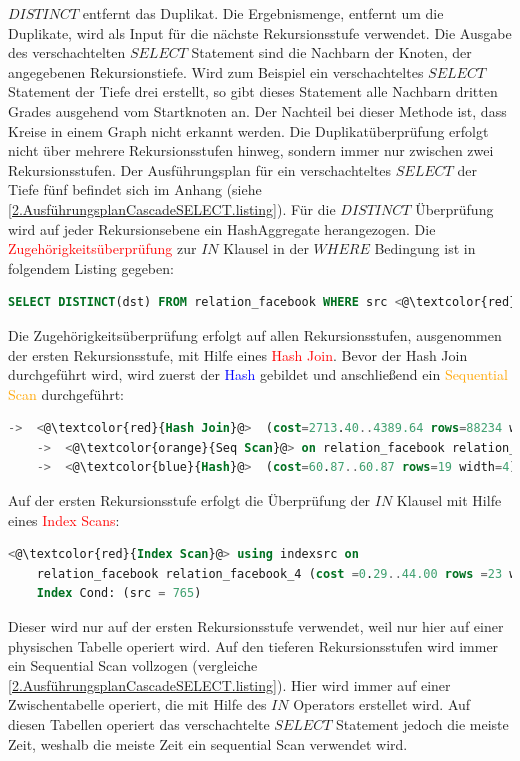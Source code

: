 $DISTINCT$ entfernt das Duplikat.
Die Ergebnismenge, entfernt um die Duplikate, wird als Input für die nächste Rekursionsstufe verwendet.
Die Ausgabe des verschachtelten $SELECT$ Statement sind die Nachbarn der Knoten, der angegebenen Rekursionstiefe.
Wird zum Beispiel ein verschachteltes $SELECT$ Statement der Tiefe drei erstellt, so gibt dieses Statement alle Nachbarn dritten Grades ausgehend vom Startknoten an.
Der Nachteil bei dieser Methode ist, dass Kreise in einem Graph nicht erkannt werden.
Die Duplikatüberprüfung erfolgt nicht über mehrere Rekursionsstufen hinweg, sondern immer nur zwischen zwei Rekursionsstufen.
Der Ausführungsplan für ein verschachteltes $SELECT$ der Tiefe fünf befindet sich im Anhang (siehe \ref{2.AusführungsplanCascadeSELECT.listing}).
Für die $DISTINCT$ Überprüfung wird auf jeder Rekursionsebene ein HashAggregate herangezogen.
Die \textcolor{red}{Zugehörigkeitsüberprüfung} zur $IN$ Klausel in der $WHERE$ Bedingung ist in folgendem Listing gegeben:
\begin{lstlisting}[language=SQL,caption = IN Klausel,frame=single, label={2.INKlauselFacebook.listing} ]
    SELECT DISTINCT(dst) FROM relation_facebook WHERE src <@\textcolor{red}{IN}@> ()
\end{lstlisting}
Die Zugehörigkeitsüberprüfung erfolgt auf allen Rekursionsstufen, ausgenommen der ersten Rekursionsstufe, mit Hilfe eines \textcolor{red}{Hash Join}.
Bevor der Hash Join durchgeführt wird, wird zuerst der \textcolor{blue}{Hash} gebildet und anschließend ein \textcolor{orange}{Sequential Scan} durchgeführt:
\begin{lstlisting}[language=SQL,caption = Aufruf der DISTINCT Funktion,frame=single, label={2.WhereConditionCTE.listing} ]
    ->  <@\textcolor{red}{Hash Join}@>  (cost=2713.40..4389.64 rows=88234 width=4) (actual time=11.821..17.797 rows=1709 loops=1)
    ->  <@\textcolor{orange}{Seq Scan}@> on relation_facebook relation_facebook_1  (cost=10000000000.00..10000001649.62 rows=100762 width=8) (actual time=0.004..4.822 rows=100762 loops=1)
    ->  <@\textcolor{blue}{Hash}@>  (cost=60.87..60.87 rows=19 width=4) (actual time=0.022..0.022 rows=4 loops=1)
\end{lstlisting}
Auf der ersten Rekursionsstufe erfolgt die Überprüfung der $IN$ Klausel mit Hilfe eines \textcolor{red}{Index Scans}:
\begin{lstlisting}[language=SQL,caption = IndexScanFacebookRelation,frame=single, label={2.indexScanFacebookRelation.listing} ]
    <@\textcolor{red}{Index Scan}@> using indexsrc on
    relation_facebook relation_facebook_4 (cost =0.29..44.00 rows =23 width =4) ( actual time =0.009..0.012 rows =27 loops =1)
    Index Cond: (src = 765)
\end{lstlisting}
Dieser wird nur auf der ersten Rekursionsstufe verwendet, weil nur hier auf einer physischen Tabelle operiert wird.
Auf den tieferen Rekursionsstufen wird immer ein Sequential Scan vollzogen (vergleiche \ref{2.AusführungsplanCascadeSELECT.listing}).
Hier wird immer auf einer Zwischentabelle operiert, die mit Hilfe des $IN$ Operators erstellet wird.
Auf diesen Tabellen operiert das verschachtelte $SELECT$ Statement jedoch die meiste Zeit, weshalb die meiste Zeit ein sequential Scan verwendet wird.

